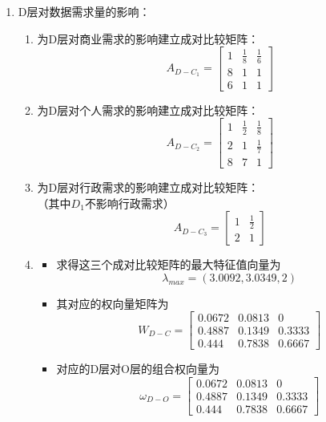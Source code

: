 \documentclass[UTF8,12pt]{ctexart}
\begin{document}
\begin{enumerate}
            \item D层对数据需求量的影响：
            \begin{enumerate}
                \item 为D层对商业需求的影响建立成对比较矩阵：
                $$A_{D-C_1}=\begin{bmatrix}
                    1 & \frac{1}{8} & \frac{1}{6} \\
                    8 & 1 & 1\\
                    6 & 1 & 1
                 \end{bmatrix}$$
                \item 为D层对个人需求的影响建立成对比较矩阵：
                $$A_{D-C_2}=\begin{bmatrix}
                    1 & \frac{1}{2} & \frac{1}{8} \\
                    2 & 1 & \frac{1}{7}\\
                    8 & 7 & 1
                 \end{bmatrix}$$
                \item 为D层对行政需求的影响建立成对比较矩阵：\\（其中$D_1$不影响行政需求）
                $$A_{D-C_3}=\begin{bmatrix}
                    1 & \frac{1}{2}\\
                    2 & 1
                 \end{bmatrix}$$
                \item \begin{itemize}
                    \item 求得这三个成对比较矩阵的最大特征值向量为$$\lambda _{max}=(3.0092,3.0349,2)$$
                    \item 其对应的权向量矩阵为$$W_{D-C}=\begin{bmatrix}
                        0.0672 & 0.0813 & 0 \\
                        0.4887 & 0.1349 & 0.3333 \\
                        0.444  & 0.7838 & 0.6667
                     \end{bmatrix}$$
                    \item 对应的D层对O层的组合权向量为$$\omega_{D-O}=\begin{bmatrix}
                        0.0672 & 0.0813 & 0 \\
                        0.4887 & 0.1349 & 0.3333 \\
                        0.444  & 0.7838 & 0.6667

\end{bmatrix}$$
\end{itemize}
\end{enumerate}
\end{enumerate}
\end{document}
